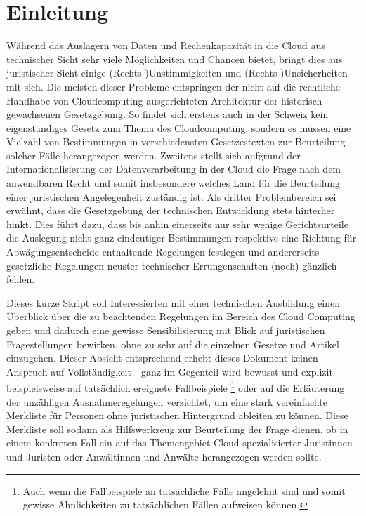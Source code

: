 \documentclass[a4paper,pointlessnumbers]{scrreprt}
\begin{document}
{ \hypersetup{hidelinks} \tableofcontents }

\chapter{Einleitung}
Während das Auslagern von Daten und Rechenkapazität in die Cloud aus technischer Sicht sehr viele Möglichkeiten und Chancen bietet, bringt dies aus juristischer Sicht einige (Rechts-)Unstimmigkeiten und (Rechts-)Unsicherheiten mit sich. Die meisten dieser Probleme entspringen der nicht auf die rechtliche Handhabe von Cloudcomputing ausgerichteten \glqq Architektur\grqq{} der historisch gewachsenen Gesetzgebung. So findet sich erstens auch in der Schweiz kein eigenständiges Gesetz zum Thema des Cloudcomputing, sondern es müssen eine Vielzahl von Bestimmungen in verschiedensten Gesetzestexten zur Beurteilung solcher Fälle herangezogen werden. Zweitens stellt sich aufgrund der Internationalisierung der Datenverarbeitung in der Cloud die Frage nach dem anwendbaren Recht und somit insbesondere welches Land für die Beurteilung einer juristischen Angelegenheit zuständig ist. Als dritter Problembereich sei erwähnt, dass die Gesetzgebung der technischen Entwicklung stets hinterher hinkt. Dies führt dazu, dass bis anhin einerseits nur sehr wenige Gerichtsurteile die Auslegung nicht ganz eindeutiger Bestimmungen respektive eine Richtung für Abwägungsentscheide enthaltende Regelungen festlegen und andererseits gesetzliche Regelungen neuster technischer Errungenschaften (noch) gänzlich fehlen. 

Dieses kurze Skript soll Interessierten mit einer technischen Ausbildung einen Überblick über die zu beachtenden Regelungen im Bereich des Cloud Computing geben und dadurch eine gewisse Sensibilisierung mit Blick auf juristischen Fragestellungen bewirken, ohne zu sehr auf die einzelnen Gesetze und Artikel einzugehen. Dieser Absicht entsprechend erhebt dieses Dokument keinen Anspruch auf Vollständigkeit - ganz im Gegenteil wird bewusst und explizit beispielsweise auf tatsächlich ereignete Fallbeispiele \footnote{Auch wenn die Fallbeispiele an tatsächliche Fälle angelehnt sind und somit gewisse Ähnlichkeiten zu tatsächlichen Fällen aufweisen können.} oder auf die Erläuterung der unzähligen Ausnahmeregelungen verzichtet, um eine stark vereinfachte Merkliste für Personen ohne juristischen Hintergrund ableiten zu können. Diese Merkliste soll sodann als Hilfswerkzeug zur Beurteilung der Frage dienen, ob in einem konkreten Fall ein auf das Themengebiet Cloud spezialisierter Juristinnen und Juristen oder Anwältinnen und Anwälte herangezogen werden sollte.
\end{document}
